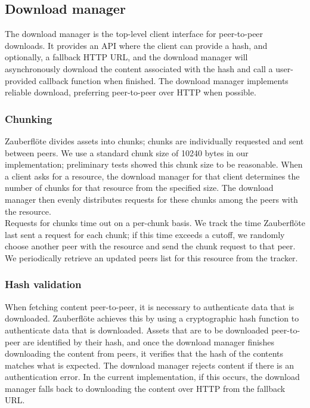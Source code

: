 \documentclass[letterpaper,twocolumn,10pt]{article}
\newcommand{\zbf}{Zauberfl\"{o}te\xspace}
\begin{document}
\subsection{Download manager}

The download manager is the top-level client interface for peer-to-peer
downloads. It provides an API where the client can provide a hash, and
optionally, a fallback HTTP URL, and the download manager will asynchronously
download the content associated with the hash and call a user-provided callback
function when finished. The download manager implements reliable download,
preferring peer-to-peer over HTTP when possible.

\subsubsection{Chunking}

\zbf divides assets into chunks; chunks are individually requested and
sent between peers. We use a standard chunk size of 10240 bytes in our
implementation; preliminary tests showed this chunk size to be reasonable.
When a client asks for a resource, the download manager for that client
determines the number of chunks for that resource from the specified size.
The download manager then evenly distributes requests for these chunks
among the peers with the resource. \\
Requests for chunks time out on a per-chunk basis. We track the time \zbf
last sent a request for each chunk; if this time exceeds a cutoff, we randomly
choose another peer with the resource and send the chunk request to that
peer. We periodically retrieve an updated peers list for this resource
from the tracker.

\subsubsection{Hash validation}

When fetching content peer-to-peer, it is necessary to authenticate data that
is downloaded. \zbf achieves this by using a cryptographic hash function to
authenticate data that is downloaded. Assets that are to be downloaded
peer-to-peer are identified by their hash, and once the download manager
finishes downloading the content from peers, it verifies that the hash of the
contents matches what is expected. The download manager rejects content if
there is an authentication error. In the current implementation, if this
occurs, the download manager falls back to downloading the content over HTTP
from the fallback URL.
\end{document}
